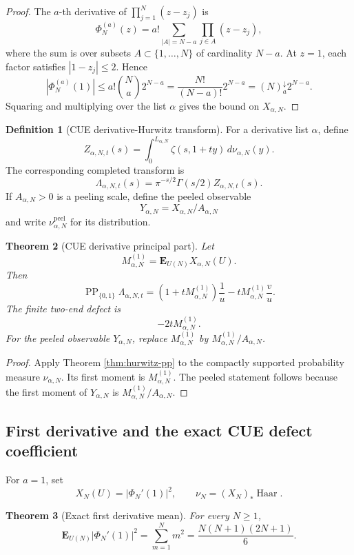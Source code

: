 \documentclass[11pt]{article}
\newcommand{\PP}{\operatorname{PP}}
\newcommand{\Haar}{\operatorname{Haar}}
\newcommand{\fall}[2]{(#1)^{\downarrow}_{#2}}
\theoremstyle{plain}
\newtheorem{theorem}{Theorem}[section]
\theoremstyle{definition}
\newtheorem{definition}[theorem]{Definition}
\begin{document}
\begin{proof}
The \(a\)-th derivative of \(\prod_{j=1}^N(z-z_j)\) is
\[
   \Phi_N^{(a)}(z)=a!\sum_{|A|=N-a}\prod_{j\in A}(z-z_j),
\]
where the sum is over subsets \(A\subset\{1,\ldots,N\}\) of cardinality \(N-a\).  At \(z=1\), each factor satisfies \(|1-z_j|\le2\).  Hence
\[
   |\Phi_N^{(a)}(1)|\le a!\binom Na2^{N-a}=\frac{N!}{(N-a)!}2^{N-a}=\fall{N}{a}2^{N-a}.
\]
Squaring and multiplying over the list \(\alpha\) gives the bound on \(X_{\alpha,N}\).
\end{proof}

\begin{definition}[CUE derivative-Hurwitz transform]\label{def:cue-hurwitz}
For a derivative list \(\alpha\), define
\[
   Z_{\alpha,N,t}(s)=\int_0^{L_{\alpha,N}}\zeta(s,1+ty)\,d\nu_{\alpha,N}(y).
\]
The corresponding completed transform is
\[
   \Lambda_{\alpha,N,t}(s)=\pi^{-s/2}\Gamma(s/2)Z_{\alpha,N,t}(s).
\]
If \(A_{\alpha,N}>0\) is a peeling scale, define the peeled observable
\[
   Y_{\alpha,N}=X_{\alpha,N}/A_{\alpha,N}
\]
and write \(\nu_{\alpha,N}^{\operatorname{peel}}\) for its distribution.
\end{definition}

\begin{theorem}[CUE derivative principal part]\label{thm:cue-pp}
Let
\[
   M_{\alpha,N}^{(1)}=\mathbf E_{U(N)}X_{\alpha,N}(U).
\]
Then
\[
   \PP_{\{0,1\}}\Lambda_{\alpha,N,t}
   =\left(1+tM_{\alpha,N}^{(1)}\right)\frac1u
   -tM_{\alpha,N}^{(1)}\frac vu.
\]
The finite two-end defect is
\[
   -2tM_{\alpha,N}^{(1)}.
\]
For the peeled observable \(Y_{\alpha,N}\), replace \(M_{\alpha,N}^{(1)}\) by \(M_{\alpha,N}^{(1)}/A_{\alpha,N}\).
\end{theorem}

\begin{proof}
Apply Theorem \ref{thm:hurwitz-pp} to the compactly supported probability measure \(\nu_{\alpha,N}\).  Its first moment is \(M_{\alpha,N}^{(1)}\).  The peeled statement follows because the first moment of \(Y_{\alpha,N}\) is \(M_{\alpha,N}^{(1)}/A_{\alpha,N}\).
\end{proof}

\subsection{First derivative and the exact CUE defect coefficient}

For \(a=1\), set
\[
   X_N(U)=|\Phi_N'(1)|^2,
   \qquad
   \nu_N=(X_N)_*\Haar.
\]

\begin{theorem}[Exact first derivative mean]\label{thm:first-deriv-mean}
For every \(N\ge1\),
\[
   \mathbf E_{U(N)}|\Phi_N'(1)|^2
   =\sum_{m=1}^N m^2
   =\frac{N(N+1)(2N+1)}6.
\]
\end{theorem}
\end{document}
